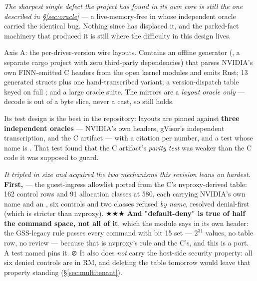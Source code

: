 \documentclass[10.5pt]{article}
\begin{document}
\emph{The sharpest single defect the project has found in its own core is still the one described
in \S\ref{sec:oracle}} — a live-memory-free in  whose independent oracle
carried the identical bug. Nothing since has displaced it, and the parked-fact machinery that
produced it is still where the difficulty in this design lives.

Axis A: the per-driver-version wire layouts. Contains an offline generator
(, a separate cargo project with zero third-party dependencies)
that parses NVIDIA's own FINN-emitted C headers from the open kernel modules and emits Rust;
13 generated structs plus one hand-transcribed variant; a version-dispatch table keyed on full
; and a large oracle suite. The \code{\#[repr(C)]} mirrors are a
\emph{layout oracle only} — decode is  out of a byte slice, never a cast,
so  still holds.

Its test design is the best in the repository: layouts are pinned against \textbf{three
independent oracles} — NVIDIA's own headers, gVisor's independent transcription, and the C
artifact — with a  citation per number, and a test whose name is
. That test found that
the C artifact's \emph{parity test} was weaker than the C code it was supposed to guard.

\emph{It tripled in size and acquired the two mechanisms this revision leans on hardest.}
\textbf{First, } — the guest-ingress allowlist ported from the C's
nvproxy-derived table: 162 control rows and 91 allocation classes at 580, each carrying NVIDIA's
own name and an , six controls and two classes refused \emph{by name}, resolved
denial-first (which is stricter than nvproxy). ★★★ \textbf{And "default-deny" is true of half the
command space, not all of it}, which the module says in its own header: the GSS-legacy rule
passes every command with bit 15 set — $2^{31}$ values, no table row, no review — because that is
nvproxy's rule and the C's, and this is a port. A test named
 pins it. ⊘ It also does
\emph{not} carry the host-side security property: all six denied controls are
 in RM, and deleting the table tomorrow would leave that property standing
(\S\ref{sec:multitenant}).
\end{document}

